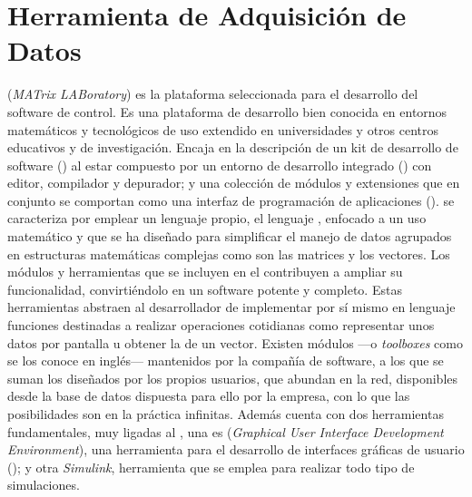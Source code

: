 \section{Herramienta de Adquisición de Datos}


\sshortpage[3]{}

 (\emph{MATrix LABoratory}) es la plataforma seleccionada para
el desarrollo del software de control. Es una plataforma de desarrollo bien
conocida en entornos matemáticos y tecnológicos de uso extendido en
universidades y otros centros educativos y de investigación. Encaja en la
descripción de un kit de desarrollo de software () al estar
compuesto por un entorno de desarrollo integrado () con editor,
compilador y depurador; y una colección de módulos y extensiones que en
conjunto se comportan como una interfaz de programación de aplicaciones
().  \matlab{} se caracteriza por emplear un lenguaje propio, el
lenguaje , enfocado a un uso matemático y que se ha diseñado para
simplificar el manejo de datos agrupados en estructuras matemáticas
complejas como son las matrices y los vectores. Los módulos y herramientas
que se incluyen en el  contribuyen a ampliar su funcionalidad,
convirtiéndolo en un software potente y completo. Estas herramientas
abstraen al desarrollador de implementar por sí mismo en lenguaje 
funciones destinadas a realizar operaciones cotidianas como representar
unos datos por pantalla u obtener la  de un vector. Existen
módulos ---o \emph{toolboxes} como se los conoce en inglés--- mantenidos
por la compañía de software, a los que se suman los diseñados por los
propios usuarios, que abundan en la red, disponibles desde la base de datos
dispuesta para ello por la empresa, con lo que las posibilidades son en la
práctica infinitas.  Además \matlab{} cuenta con dos herramientas
fundamentales, muy ligadas al , una es 
(\emph{Graphical User Interface Development Environment}), una herramienta
para el desarrollo de interfaces gráficas de usuario (); y otra
\emph{Simulink}, herramienta que se emplea para realizar todo tipo de
simulaciones.

